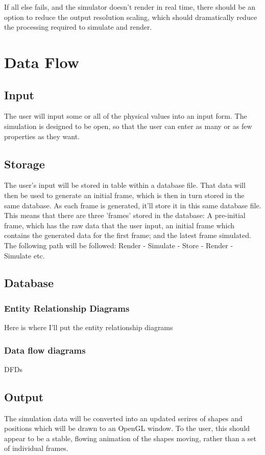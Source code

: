If all else fails, and the simulator doesn't render in real time, there should be an option to reduce the output resolution scaling, which should dramatically reduce the processing required to simulate and render.

\section{Data Flow}
\subsection{Input}
	The user will input some or all of the physical values into an input form. The simulation is designed to be open, so that the user can enter as many or as few properties as they want.

\subsection{Storage}
	The user's input will be stored in table within a database file. That data will then be used to generate an initial frame, which is then in turn stored in the same database. As each frame is generated, it'll store it in this same database file. This means that there are three 'frames' stored in the database: A pre-initial frame, which has the raw data that the user input, an initial frame which contains the generated data for the first frame; and the latest frame simulated. The following path will be followed: Render - Simulate - Store - Render - Simulate etc.

\subsection{Database}

\subsubsection{Entity Relationship Diagrams}
	Here is where I'll put the entity relationship diagrams

\subsubsection{Data flow diagrams}
	DFDs


\subsection{Output}
	The simulation data will be  converted into an updated serires of shapes and positions which will be drawn to an OpenGL window. To the user, this should appear to be a stable, flowing animation of the shapes moving, rather than a set of individual frames.

